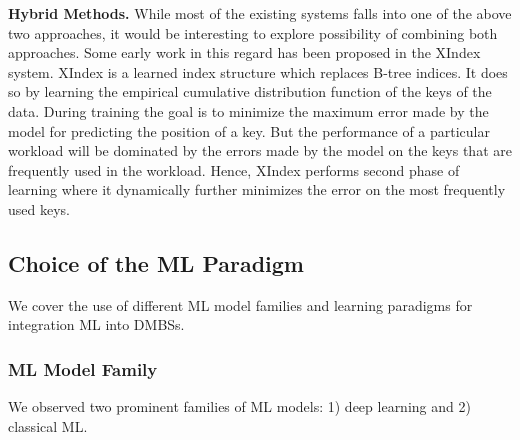 \vspace{2mm}
\noindent \textbf{Hybrid Methods.} While most of the existing systems falls into one of the above two approaches, it would be interesting to explore possibility of combining both approaches.
Some early work in this regard has been proposed in the XIndex~\cite{xindex} system.
XIndex is a learned index structure which replaces B-tree indices.
It does so by learning the empirical cumulative distribution function of the keys of the data.
During training the goal is to minimize the maximum error made by the model for predicting the position of a key.
But the performance of a particular workload will be dominated by the errors made by the model on the keys that are frequently used in the workload.
Hence, XIndex performs second phase of learning where it dynamically further minimizes the error on the most frequently used keys.


\subsection{Choice of the ML Paradigm}
We cover the use of different ML model families and learning paradigms for integration ML into DMBSs.

\subsubsection{ML Model Family}
We observed two prominent families of ML models: 1) deep learning and 2) classical ML.

